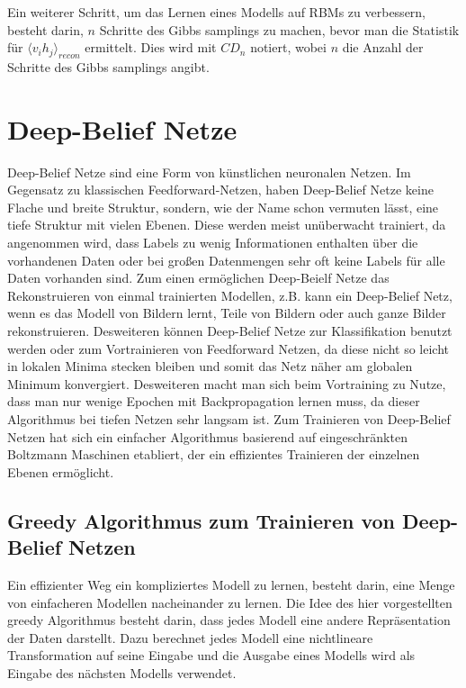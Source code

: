 \documentclass[12pt]{article}
\begin{document}
Ein weiterer Schritt, um das Lernen eines Modells auf RBMs zu verbessern, besteht darin, $n$ Schritte des Gibbs samplings zu machen, bevor man die Statistik für $\langle v_i h_j \rangle_{recon}$ ermittelt. Dies wird mit $CD_n$ notiert, wobei $n$ die Anzahl der Schritte des Gibbs samplings angibt.

\section{Deep-Belief Netze}
Deep-Belief Netze sind eine Form von künstlichen neuronalen Netzen. Im Gegensatz zu klassischen Feedforward-Netzen, haben Deep-Belief Netze keine Flache und breite Struktur, sondern, wie der Name schon vermuten lässt, eine tiefe Struktur mit vielen Ebenen.   Diese werden meist unüberwacht trainiert, da angenommen wird, dass Labels zu wenig Informationen enthalten über die vorhandenen Daten oder bei großen Datenmengen sehr oft keine Labels für alle Daten vorhanden sind.  Zum einen ermöglichen Deep-Beielf Netze das Rekonstruieren von einmal trainierten Modellen, z.B. kann ein Deep-Belief Netz, wenn es das Modell von Bildern lernt, Teile von Bildern oder auch ganze Bilder rekonstruieren. Desweiteren können Deep-Belief Netze zur Klassifikation benutzt werden oder zum Vortrainieren von Feedforward Netzen, da diese nicht so leicht in lokalen Minima stecken bleiben und somit das Netz näher am globalen Minimum konvergiert. Desweiteren macht man sich beim Vortraining zu Nutze, dass man nur wenige Epochen mit Backpropagation lernen muss, da dieser Algorithmus bei tiefen Netzen sehr langsam ist. Zum Trainieren von Deep-Belief Netzen hat sich ein einfacher Algorithmus basierend auf eingeschränkten Boltzmann Maschinen etabliert, der ein effizientes Trainieren der einzelnen Ebenen ermöglicht. 



\subsection{Greedy Algorithmus zum Trainieren von Deep-Belief Netzen}


Ein effizienter Weg ein kompliziertes Modell zu lernen, besteht darin, eine Menge von einfacheren Modellen nacheinander zu lernen. Die Idee des hier vorgestellten greedy Algorithmus besteht darin, dass jedes Modell eine andere Repräsentation der Daten darstellt. Dazu berechnet jedes Modell eine nichtlineare Transformation auf seine Eingabe und die Ausgabe eines Modells wird als Eingabe des nächsten Modells verwendet. 
\end{document}

